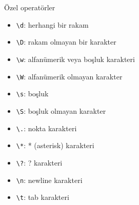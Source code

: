 Özel operatörler
\begin{itemize}
    \item \verb|\d|: herhangi bir rakam
    \item \verb|\D|: rakam olmayan bir karakter
    \item \verb|\w|: alfanümerik veya boşluk karakteri
    \item \verb|\W|: alfanümerik olmayan karakter
    \item \verb|\s|: boşluk
    \item \verb|\S|: boşluk olmayan karakter
    \item \verb|\.|: nokta karakteri
    \item \verb|\*|: * (asterisk) karakteri
    \item \verb|\?|: ? karakteri
    \item \verb|\n|: newline karakteri
    \item \verb|\t|: tab karakteri
\end{itemize}

\newpage